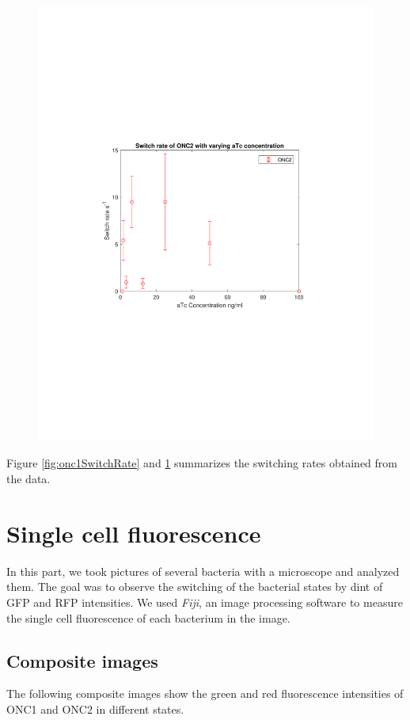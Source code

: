 \documentclass[11pt]{book}
\begin{document}
\begin{figure}[h]
\centering
\includegraphics[scale=0.8]{ONC2switchrate.pdf}
\caption{}
\label{fig:onc2SwitchRate}
\end{figure}

Figure \ref{fig:onc1SwitchRate} and \ref{fig:onc2SwitchRate} summarizes the switching rates obtained from the data. 

\pagebreak
\section{Single cell fluorescence}
In this part, we took pictures of several bacteria with a microscope and analyzed them. The goal was to observe the switching of the bacterial states by dint of  GFP and RFP intensities. We used \textit{Fiji}, an image processing software to measure the single cell fluorescence of each bacterium in the image. 

\subsection{Composite images}
The following composite images show the green and red fluorescence intensities of ONC1 and ONC2 in different states. 
\end{document}
